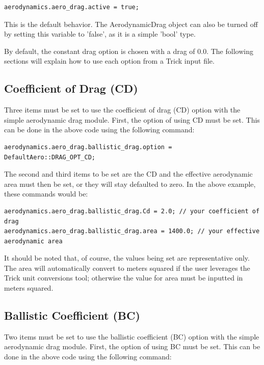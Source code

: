 \begin{verbatim}
aerodynamics.aero_drag.active = true;
\end{verbatim}

This is the default behavior. The AerodynamicDrag object can also be
turned off by setting this variable to 'false', as it is a simple 'bool'
type.

By default, the constant drag option is chosen with a drag of 0.0. The
following sections will explain how to use each option from a Trick input
file.

\subsection{Coefficient of Drag (CD)}

Three items must be set to use the coefficient of drag (CD) option with the
simple aerodynamic drag module. First, the option of using CD must
be set. This can be done in the above code using the following command:

\begin{verbatim}
aerodynamics.aero_drag.ballistic_drag.option = DefaultAero::DRAG_OPT_CD;
\end{verbatim}

The second and third items to be set are the CD and the effective aerodynamic area must then be set, or they will
stay defaulted to zero. In the above example, these commands would be:

\begin{verbatim}
aerodynamics.aero_drag.ballistic_drag.Cd = 2.0; // your coefficient of drag
aerodynamics.aero_drag.ballistic_drag.area = 1400.0; // your effective
aerodynamic area
\end{verbatim}

It should be noted that, of course, the values being set are representative
only. The area will automatically convert to meters squared if the user
leverages the Trick unit conversions tool; otherwise the value for area
must be inputted in meters squared.

\subsection{Ballistic Coefficient (BC)}

Two items must be set to use the ballistic coefficient (BC) option with the
simple aerodynamic drag module. First, the option of using BC must
be set. This can be done in the above code using the following command:


